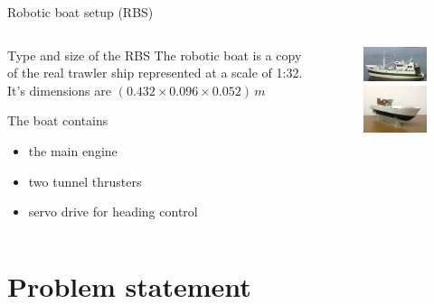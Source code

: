 \documentclass[10pt,pdf,hyperref={unicode}]{beamer}
\begin{document}
\begin{frame}{Robotic boat setup (RBS)}

\begin{columns}
\begin{column}{0.5\linewidth}
\begin{alertblock}{Type and size of the RBS} 
The robotic boat is a copy of the real trawler ship represented at a scale of 1:32. It's dimensions are $(0.432\times0.096\times0.052)\,m$
\end{alertblock}
The boat contains
\begin{itemize}
	\item the main engine
	\item two tunnel thrusters 
	\item servo drive for heading control
\end{itemize}
\end{column}
\begin{column}{0.5\linewidth}
	
\begin{figure}
\includegraphics[width=4.5cm]{Rossvik.png}\quad
\includegraphics[width=4.5cm]{RBS_2.png}\quad
\end{figure}
 
 \centering
{}

\end{column}
\end{columns}

\end{frame}

\section{Problem statement}
\end{document}
